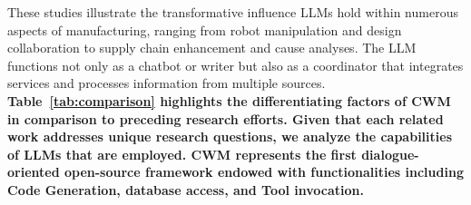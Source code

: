 \documentclass[preprint,12pt]{elsarticle}
\begin{document}
These studies illustrate the transformative influence LLMs hold within numerous aspects of manufacturing, ranging from robot manipulation and design collaboration to supply chain enhancement and cause analyses.
The LLM functions not only as a chatbot or writer but also as a coordinator that integrates services and processes information from multiple sources.
\textbf{Table~\ref{tab:comparison} highlights the differentiating factors of CWM in comparison to preceding research efforts. 
Given that each related work addresses unique research questions, we analyze the capabilities of LLMs that are employed. 
CWM represents the first dialogue-oriented open-source framework endowed with functionalities including Code Generation, database access, and Tool invocation.}
\end{document}
